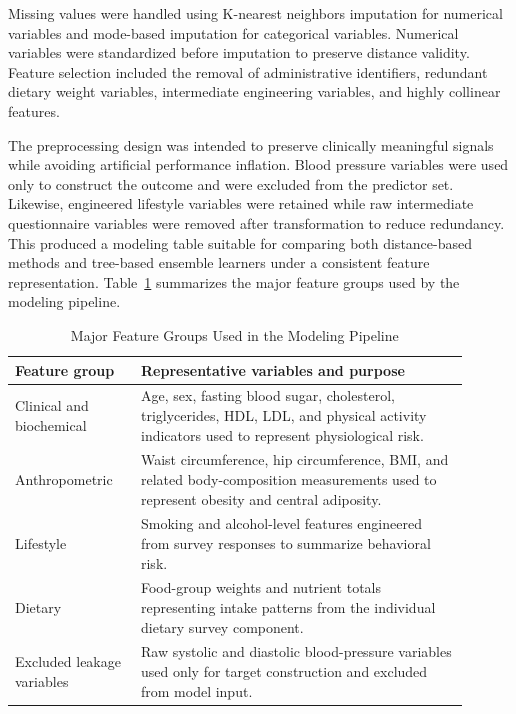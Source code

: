 \documentclass[journal]{IEEEtran}
\begin{document}
Missing values were handled using K-nearest neighbors imputation for numerical variables and mode-based imputation for categorical variables. Numerical variables were standardized before imputation to preserve distance validity. Feature selection included the removal of administrative identifiers, redundant dietary weight variables, intermediate engineering variables, and highly collinear features.

The preprocessing design was intended to preserve clinically meaningful signals while avoiding artificial performance inflation. Blood pressure variables were used only to construct the outcome and were excluded from the predictor set. Likewise, engineered lifestyle variables were retained while raw intermediate questionnaire variables were removed after transformation to reduce redundancy. This produced a modeling table suitable for comparing both distance-based methods and tree-based ensemble learners under a consistent feature representation. Table~\ref{tab:featuregroups} summarizes the major feature groups used by the modeling pipeline.

\begin{table}[!t]
\caption{Major Feature Groups Used in the Modeling Pipeline}
\label{tab:featuregroups}
\centering
\footnotesize
\begin{tabular}{p{0.25\linewidth}p{0.65\linewidth}}
\toprule
Feature group & Representative variables and purpose\\
\midrule
Clinical and biochemical & Age, sex, fasting blood sugar, cholesterol, triglycerides, HDL, LDL, and physical activity indicators used to represent physiological risk.\\
Anthropometric & Waist circumference, hip circumference, BMI, and related body-composition measurements used to represent obesity and central adiposity.\\
Lifestyle & Smoking and alcohol-level features engineered from survey responses to summarize behavioral risk.\\
Dietary & Food-group weights and nutrient totals representing intake patterns from the individual dietary survey component.\\
Excluded leakage variables & Raw systolic and diastolic blood-pressure variables used only for target construction and excluded from model input.\\
\bottomrule
\end{tabular}
\end{table}
\end{document}
